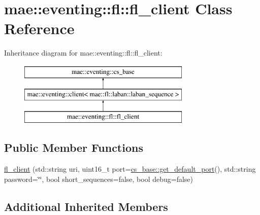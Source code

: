 \hypertarget{classmae_1_1eventing_1_1fl_1_1fl__client}{\section{mae\-:\-:eventing\-:\-:fl\-:\-:fl\-\_\-client Class Reference}
\label{classmae_1_1eventing_1_1fl_1_1fl__client}
}
Inheritance diagram for mae\-:\-:eventing\-:\-:fl\-:\-:fl\-\_\-client\-:\begin{figure}[H]
\begin{center}
\leavevmode
\includegraphics[height=3.000000cm]{classmae_1_1eventing_1_1fl_1_1fl__client}
\end{center}
\end{figure}
\subsection*{Public Member Functions}
\begin{DoxyCompactItemize}
\item 
\hyperlink{classmae_1_1eventing_1_1fl_1_1fl__client_a76156e6e8b7a6703115d7f2d6aa76e78}{fl\-\_\-client} (std\-::string uri, uint16\-\_\-t port=\hyperlink{classmae_1_1eventing_1_1cs__base_a5c068f50b548ec7299133976c00fa5a4}{cs\-\_\-base\-::get\-\_\-default\-\_\-port}(), std\-::string password=\char`\"{}\char`\"{}, bool short\-\_\-sequences=false, bool debug=false)
\end{DoxyCompactItemize}
\subsection*{Additional Inherited Members}


